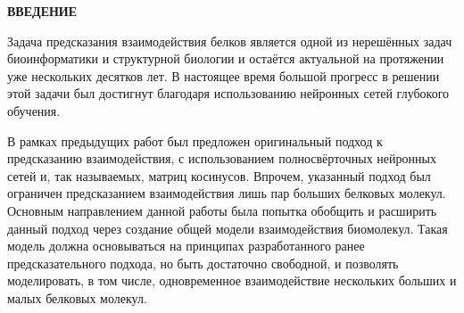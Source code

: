\newpage
\renewcommand{\contentsname}{\centerline{\large ОГЛАВЛЕНИЕ}}
\tableofcontents

\newpage
{}
\begin{center}
	\textbf{\large ВВЕДЕНИЕ}
\end{center}

Задача предсказания взаимодействия белков является одной из нерешённых задач биоинформатики и структурной биологии и остаётся актуальной на протяжении уже нескольких десятков лет. В настоящее время большой прогресс в решении этой задачи был достигнут благодаря использованию нейронных сетей глубокого обучения.

В рамках предыдущих работ \cite{prip2023} был предложен оригинальный подход к предсказанию взаимодействия, с использованием полносвёрточных нейронных сетей \cite{fully_conv} и, так называемых, матриц косинусов. Впрочем, указанный подход был ограничен предсказанием взаимодействия лишь пар больших белковых молекул. Основным направлением данной работы была попытка обобщить и расширить данный подход через создание общей модели взаимодействия биомолекул. Такая модель должна основываться на принципах разработанного ранее предсказательного подхода, но быть достаточно свободной, и позволять моделировать, в том числе, одновременное взаимодействие нескольких больших и малых белковых молекул.



